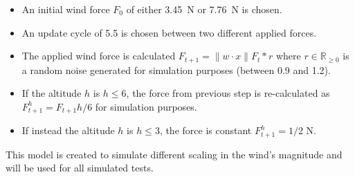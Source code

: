 \documentclass[conference]{IEEEtran}
\begin{document}
\begin{itemize}
    \item An initial wind force $F_0$ of either \SI{3.45}{\newton} or \SI{7.76}{\newton} is chosen.
    
    \item An update cycle of \SI{5.5}{\sec} is chosen between two different applied forces.
    
    
    \item The applied wind force is calculated $F_{t+1}=\|w\cdot x\|F_t*r$ 
%    
%  
%    
where $r\in\mathbb{R}_{\geq 0}$ is a random noise generated for simulation purposes (between 0.9 and 1.2). 
    
    \item If the altitude $h$ is $h\leq 6$, the force from previous step is re-calculated as $F^h_{t+1}=F_{t+1}h/6$ for simulation purposes.
   
   \item If instead the altitude $h$ is $h\leq 3$, the force is constant $F^h_{t+1}=1/2$ N.%

    
\end{itemize}
%
This model is created to simulate different scaling in the wind's magnitude and will be used for all simulated tests.
\end{document}
